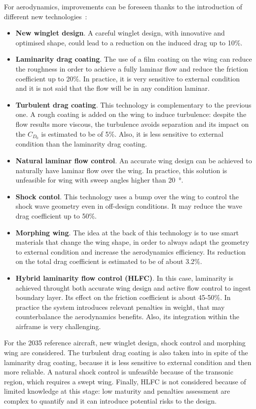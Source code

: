 For aerodynamics, improvements can be foreseen thanks to the introduction of different new technologies~\cite{bib:iata_annex}: 
\begin{itemize}
	\item \textbf{New winglet design}. A careful winglet design, with innovative and optimised shape, could lead to a reduction on the induced drag up to 10\%.
	
	\item \textbf{Laminarity drag coating}. The use of a film coating on the wing can reduce the roughness in order to achieve a fully laminar flow and reduce the friction coefficient up to 20\%. In practice, it is very sensitive to external condition and it is not said that the flow will be in any condition laminar.
	
	\item \textbf{Turbulent drag coating}. This technology is complementary to the previous one. A rough coating is added on the wing to induce turbulence: despite the flow results more viscous, the turbulence avoids separation and its impact on the $C_{D_{0}}$ is estimated to be of 5\%. Also, it is less sensitive to external condition than the laminarity drag coating.
	
	\item \textbf{Natural laminar flow control}. An accurate wing design can be achieved to naturally have laminar flow over the wing. In practice, this solution is unfeasible for wing with sweep angles higher than 20~\si{\degree}. 
	
	\item \textbf{Shock contol}. This technology uses a bump over the wing to control the shock wave geometry even in off-design conditions. 
	It may reduce the wave drag coefficient up to 50\%.
	
	\item \textbf{Morphing wing}. The idea at the back of this technology is to use smart materials that change the wing shape, in order to always adapt the geometry to external condition and increase the aerodynamics efficiency. 
	Its reduction on the total drag coefficient is estimated to be of about 3.2\%. 
	
	\item \textbf{Hybrid laminarity flow control (HLFC)}. In this case, laminarity is achieved throught both accurate wing design and active flow control to ingest boundary layer. Its effect on the friction coefficient is about 45-50\%. In practice the system introduces relevant penalties in weight, that may counterbalance the aerodynamics benefits. Also, its integration within the airframe is very challenging. 
\end{itemize}
For the 2035 reference aircraft, new winglet design, shock control and morphing wing are considered. 
The turbulent drag coating is also taken into in spite of the laminarity drag coating, because it is less sensitive to external condition and then more reliable. 
A natural shock control is unfeasible because of the transonic region, which requires a swept wing. 
Finally, HLFC is not considered because of limited knowledge at this stage: low maturity and penalties assessment are complex to quantify and it can introduce potential risks to the design. 

